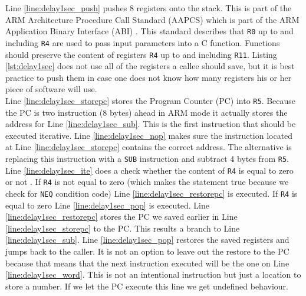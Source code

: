 Line \ref{line:delay1sec_push} pushes 8 registers onto the stack. 
This is part of the ARM Architecture Procedure Call Standard (AAPCS) which is part of the ARM Application Binary Interface (ABI) \cite{IntroEmbeddedSystems}.
This standard describes that \texttt{R0} up to and including \texttt{R4} are used to pass input parameters into a C function. 
Functions should preserve the content of registers \texttt{R4} up to and including \texttt{R11}.
Listing \ref{lst:delay1sec} does not use all of the registers a callee should save, but it is best practice to push them in case one does not know how many registers his or her piece of software will use.\\
Line \ref{line:delay1sec_storepc} stores the Program Counter (PC) into \texttt{R5}. 
Because the PC is two instruction (8 bytes) ahead in ARM mode it actually stores the address for Line \ref{line:delay1sec_sub}.
This is the first instruction that should be executed iterative.
Line \ref{line:delay1sec_nop} makes sure the instruction located at Line \ref{line:delay1sec_storepc} contains the correct address. The alternative is replacing this instruction with a \texttt{SUB} instruction and subtract 4 bytes from \texttt{R5}.
Line \ref{line:delay1sec_ite} does a check whether the content of \texttt{R4} is equal to zero or not \cite{DefinitiveGuide}.
If \texttt{R4} is not equal to zero (which makes the statement true because we check for \texttt{NEQ} condition code) Line \ref{line:delay1sec_restorepc} is executed. If \texttt{R4} is equal to zero Line \ref{line:delay1sec_pop} is executed.
Line \ref{line:delay1sec_restorepc} stores the PC we saved earlier in Line \ref{line:delay1sec_storepc} to the PC.
This results a branch to Line \ref{line:delay1sec_sub}.
Line \ref{line:delay1sec_pop} restores the saved registers and jumps back to the caller. 
It is not an option to leave out the restore to the PC because that means that the next instruction executed will be the one on Line \ref{line:delay1sec_word}.
This is not an intentional instruction but just a location to store a number. If we let the PC execute this line we get undefined behaviour.


